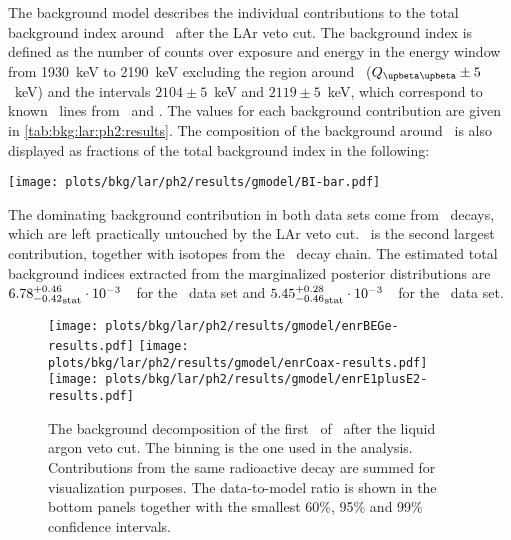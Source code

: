 \sloppy The background model describes the individual contributions to the total background index
around \qbb\ after the LAr veto cut. The background index is defined as the number
of counts over exposure and energy in the energy window from 1930~keV to 2190~keV
excluding the region around \qbb\ ($\qbbM \pm 5$~keV) and the intervals $2104 \pm 5$~keV
and $2119 \pm 5$~keV, which correspond to known \g\ lines from \Tl\ and \Bih. The values
for each background contribution are given in \cref{tab:bkg:lar:ph2:results}. The
composition of the background around \qbb\ is also displayed as fractions of the total
background index in the following:
\begin{center}
  \texttt{[image: plots/bkg/lar/ph2/results/gmodel/BI-bar.pdf]}
\end{center}
The dominating background contribution in both data sets come from
\a\ decays, which are left practically untouched by the LAr veto cut. \kvz\ is the second
largest contribution, together with isotopes from the \Uh\ decay chain.
The estimated total
background indices extracted from the marginalized posterior distributions are
${6.78^{+0.46}_{-0.42}}_\text{stat} \cdot 10^{-3}$~\ctsper\ for the \enrBEGeII\ data set and
${5.45^{+0.28}_{-0.46}}_\text{stat} \cdot 10^{-3}$~\ctsper\ for the \enrCoaxII\ data set.

\begin{sidewaystable}
  \footnotesize
  \centering
  \caption{%
    Summary of the background decomposition after LAr veto cut. The number of
    reconstructed counts in the fit range and the BI at \qbb\ is listed for each component
    and each analysis data set. Marginalized modes, along with its smallest 68\% C.I., are
    reported as representatives of the marginalized posterior distributions.
  }\label{tab:bkg:lar:ph2:results}
  
\end{sidewaystable}

\begin{figure}
  \centering
  \texttt{[image: plots/bkg/lar/ph2/results/gmodel/enrBEGe-results.pdf]}
  \texttt{[image: plots/bkg/lar/ph2/results/gmodel/enrCoax-results.pdf]}
  \texttt{[image: plots/bkg/lar/ph2/results/gmodel/enrE1plusE2-results.pdf]}
  \caption{%
    The background decomposition of the first \gexpophasetwobkg\ of \gerdatwo\ after the
    liquid argon veto cut. The binning is the one used in the analysis. Contributions from
    the same radioactive decay are summed for visualization purposes. The data-to-model
    ratio is shown in the bottom panels together with the smallest 60\%, 95\% and 99\%
    confidence intervals.
  }\label{fig:bkg:lar:ph2:results}
\end{figure}

